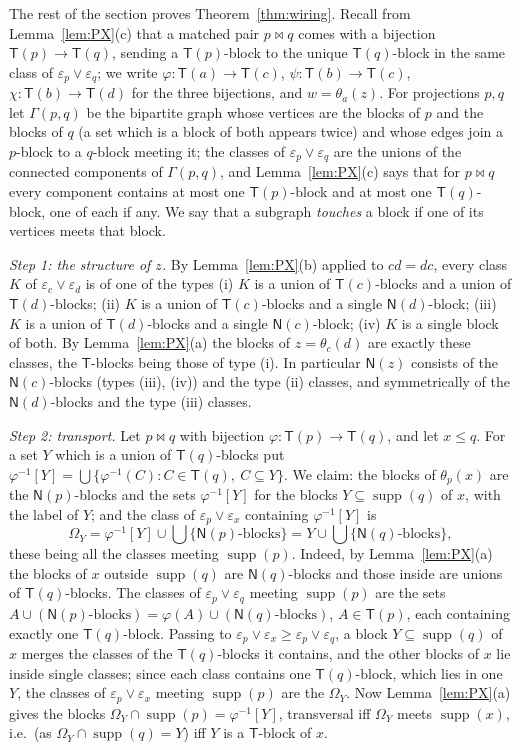 \documentclass[11pt]{amsart}
\theoremstyle{definition}
\newcommand{\supp}{\operatorname{supp}}
\newcommand{\T}{\mathsf{T}}
\newcommand{\N}{\mathsf{N}}
\newcommand{\mt}{\bowtie}   %
\begin{document}
The rest of the section proves Theorem~\ref{thm:wiring}. Recall from Lemma~\ref{lem:PX}(c) that a matched pair $p\mt q$ comes with a bijection $\T(p)\to\T(q)$, sending a $\T(p)$-block to the unique $\T(q)$-block in the same class of $\varepsilon_p\vee\varepsilon_q$; we write $\varphi\colon\T(a)\to\T(c)$, $\psi\colon\T(b)\to\T(c)$, $\chi\colon\T(b)\to\T(d)$ for the three bijections, and $w=\theta_a(z)$. For projections $p,q$ let $\Gamma(p,q)$ be the bipartite graph whose vertices are the blocks of $p$ and the blocks of $q$ (a set which is a block of both appears twice) and whose edges join a $p$-block to a $q$-block meeting it; the classes of $\varepsilon_p\vee\varepsilon_q$ are the unions of the connected components of $\Gamma(p,q)$, and Lemma~\ref{lem:PX}(c) says that for $p\mt q$ every component contains at most one $\T(p)$-block and at most one $\T(q)$-block, one of each if any. We say that a subgraph \emph{touches} a block if one of its vertices meets that block.

\smallskip
\emph{Step 1: the structure of $z$.} By Lemma~\ref{lem:PX}(b) applied to $cd=dc$, every class $K$ of $\varepsilon_c\vee\varepsilon_d$ is of one of the types (i) $K$ is a union of $\T(c)$-blocks and a union of $\T(d)$-blocks; (ii) $K$ is a union of $\T(c)$-blocks and a single $\N(d)$-block; (iii) $K$ is a union of $\T(d)$-blocks and a single $\N(c)$-block; (iv) $K$ is a single block of both. By Lemma~\ref{lem:PX}(a) the blocks of $z=\theta_c(d)$ are exactly these classes, the $\T$-blocks being those of type (i). In particular $\N(z)$ consists of the $\N(c)$-blocks (types (iii), (iv)) and the type (ii) classes, and symmetrically of the $\N(d)$-blocks and the type (iii) classes.

\smallskip
\emph{Step 2: transport.} Let $p\mt q$ with bijection $\varphi\colon\T(p)\to\T(q)$, and let $x\le q$. For a set $Y$ which is a union of $\T(q)$-blocks put $\varphi^{-1}[Y]=\bigcup\{\varphi^{-1}(C):C\in\T(q),\ C\subseteq Y\}$. We claim: the blocks of $\theta_p(x)$ are the $\N(p)$-blocks and the sets $\varphi^{-1}[Y]$ for the blocks $Y\subseteq\supp(q)$ of $x$, with the label of $Y$; and the class of $\varepsilon_p\vee\varepsilon_x$ containing $\varphi^{-1}[Y]$ is
\[
\Omega_Y=\varphi^{-1}[Y]\cup\textstyle\bigcup\{\text{$\N(p)$-blocks}\}=Y\cup\bigcup\{\text{$\N(q)$-blocks}\},
\]
these being all the classes meeting $\supp(p)$. Indeed, by Lemma~\ref{lem:PX}(a) the blocks of $x$ outside $\supp(q)$ are $\N(q)$-blocks and those inside are unions of $\T(q)$-blocks. The classes of $\varepsilon_p\vee\varepsilon_q$ meeting $\supp(p)$ are the sets $A\cup(\N(p)\text{-blocks})=\varphi(A)\cup(\N(q)\text{-blocks})$, $A\in\T(p)$, each containing exactly one $\T(q)$-block. Passing to $\varepsilon_p\vee\varepsilon_x\ge\varepsilon_p\vee\varepsilon_q$, a block $Y\subseteq\supp(q)$ of $x$ merges the classes of the $\T(q)$-blocks it contains, and the other blocks of $x$ lie inside single classes; since each class contains one $\T(q)$-block, which lies in one $Y$, the classes of $\varepsilon_p\vee\varepsilon_x$ meeting $\supp(p)$ are the $\Omega_Y$. Now Lemma~\ref{lem:PX}(a) gives the blocks $\Omega_Y\cap\supp(p)=\varphi^{-1}[Y]$, transversal iff $\Omega_Y$ meets $\supp(x)$, i.e.\ (as $\Omega_Y\cap\supp(q)=Y$) iff $Y$ is a $\T$-block of $x$.
\end{document}
